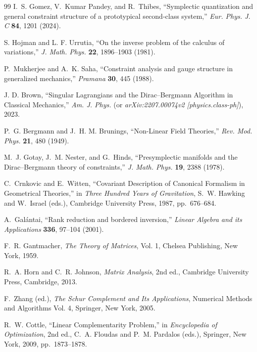 \documentclass[11pt,a4paper]{article}
\begin{document}
\begin{thebibliography}{99}
	I.~S. Gomez, V.~Kumar Pandey, and R.~Thibes, ``Symplectic quantization and general constraint structure of a prototypical second-class system,'' \textit{Eur. Phys. J. C} \textbf{84}, 1201 (2024).
	
	S. Hojman and L. F. Urrutia, ``On the inverse problem of the calculus of variations,'' \textit{J. Math. Phys.} \textbf{22}, 1896--1903 (1981).
	
	P.~Mukherjee and A.~K. Saha, ``Constraint analysis and gauge structure in generalized mechanics,'' \textit{Pramana} \textbf{30}, 445 (1988).
	
	J. D. Brown, ``Singular Lagrangians and the Dirac--Bergmann Algorithm in Classical Mechanics,'' \textit{Am. J. Phys.} (or \textit{arXiv:2207.00074v2 [physics.class-ph]}), 2023.
	
	P.~G. Bergmann and J.~H. M. Brunings, ``Non-Linear Field Theories,'' \textit{Rev. Mod. Phys.} \textbf{21}, 480 (1949).
	
	M.~J. Gotay, J.~M. Nester, and G.~Hinds, ``Presymplectic manifolds and the Dirac--Bergmann theory of constraints,'' \textit{J. Math. Phys.} \textbf{19}, 2388 (1978).
	
	C.~Crnkovic and E.~Witten, ``Covariant Description of Canonical Formalism in Geometrical Theories,'' in \textit{Three Hundred Years of Gravitation}, S.~W. Hawking and W.~Israel (eds.), Cambridge University Press, 1987, pp.~676--684.
	
	A.~Gal\'antai, ``Rank reduction and bordered inversion,'' \textit{Linear Algebra and its Applications} \textbf{336}, 97--104 (2001).
	
	F.~R. Gantmacher, \textit{The Theory of Matrices}, Vol. 1, Chelsea Publishing, New York, 1959.
	
	R.~A. Horn and C.~R. Johnson, \textit{Matrix Analysis}, 2nd ed., Cambridge University Press, Cambridge, 2013.
	
	F.~Zhang (ed.), \textit{The Schur Complement and Its Applications}, Numerical Methods and Algorithms Vol. 4, Springer, New York, 2005.
	
	R.~W. Cottle, ``Linear Complementarity Problem,'' in \textit{Encyclopedia of Optimization}, 2nd ed., C.~A. Floudas and P.~M. Pardalos (eds.), Springer, New York, 2009, pp.~1873--1878.
	

\end{thebibliography}
\end{document}
